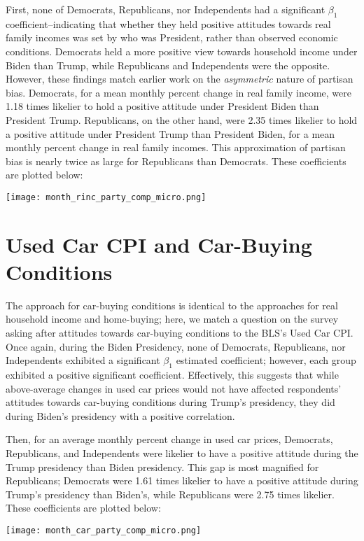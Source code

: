 \documentclass{article}
\begin{document}
First, none of Democrats, Republicans, nor Independents had a significant $\beta_1$ coefficient--indicating that whether they held positive attitudes towards real family incomes was set by who was President, rather than observed economic conditions. Democrats held a more positive view towards household income under Biden than Trump, while Republicans and Independents were the opposite. However, these findings match earlier work on the \textit{asymmetric} nature of partisan bias. Democrats, for a mean monthly percent change in real family income, were 1.18 times likelier to hold a positive attitude under President Biden than President Trump. Republicans, on the other hand, were 2.35 times likelier to hold a positive attitude under President Trump than President Biden, for a mean monthly percent change in real family incomes. This approximation of partisan bias is nearly twice as large for Republicans than Democrats. These coefficients are plotted below:

\centering \texttt{[image: month\_rinc\_party\_comp\_micro.png]}

\raggedright \section{Used Car CPI and Car-Buying Conditions}

The approach for car-buying conditions is identical to the approaches for real household income and home-buying; here, we match a question on the survey asking after attitudes towards car-buying conditions to the BLS's Used Car CPI. Once again, during the Biden Presidency, none of Democrats, Republicans, nor Independents exhibited a significant $\beta_1$ estimated coefficient; however, each group exhibited a positive significant coefficient. Effectively, this suggests that while above-average changes in used car prices would not have affected respondents' attitudes towards car-buying conditions during Trump's presidency, they did during Biden's presidency with a positive correlation.

Then, for an average monthly percent change in used car prices, Democrats, Republicans, and Independents were likelier to have a positive attitude during the Trump presidency than Biden presidency. This gap is most magnified for Republicans; Democrats were 1.61 times likelier to have a positive attitude during Trump's presidency than Biden's, while Republicans were 2.75 times likelier. These coefficients are plotted below:

\centering \texttt{[image: month\_car\_party\_comp\_micro.png]}
\end{document}
